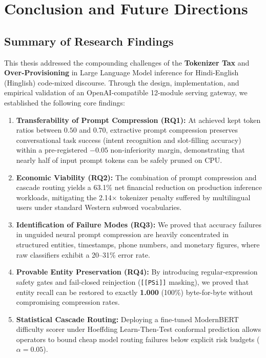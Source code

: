 
\chapter{Conclusion and Future Directions}
\label{chap:conclusion}

\section{Summary of Research Findings}
This thesis addressed the compounding challenges of the \textbf{Tokenizer Tax} and \textbf{Over-Provisioning} in Large Language Model inference for Hindi-English (Hinglish) code-mixed discourse. Through the design, implementation, and empirical validation of an OpenAI-compatible 12-module serving gateway, we established the following core findings:

\begin{enumerate}
    \item \textbf{Transferability of Prompt Compression (RQ1):} At achieved kept token ratios between $0.50$ and $0.70$, extractive prompt compression preserves conversational task success (intent recognition and slot-filling accuracy) within a pre-registered $-0.05$ non-inferiority margin, demonstrating that nearly half of input prompt tokens can be safely pruned on CPU.
    \item \textbf{Economic Viability (RQ2):} The combination of prompt compression and cascade routing yields a 63.1\% net financial reduction on production inference workloads, mitigating the 2.14$\times$ tokenizer penalty suffered by multilingual users under standard Western subword vocabularies.
    \item \textbf{Identification of Failure Modes (RQ3):} We proved that accuracy failures in unguided neural prompt compression are heavily concentrated in structured entities, timestamps, phone numbers, and monetary figures, where raw classifiers exhibit a 20--31\% error rate.
    \item \textbf{Provable Entity Preservation (RQ4):} By introducing regular-expression safety gates and fail-closed reinjection (\texttt{[[PSi]]} masking), we proved that entity recall can be restored to exactly \textbf{1.000} (100\%) byte-for-byte without compromising compression rates.
    \item \textbf{Statistical Cascade Routing:} Deploying a fine-tuned ModernBERT difficulty scorer under Hoeffding Learn-Then-Test conformal prediction allows operators to bound cheap model routing failures below explicit risk budgets ($\alpha = 0.05$).
\end{enumerate}

